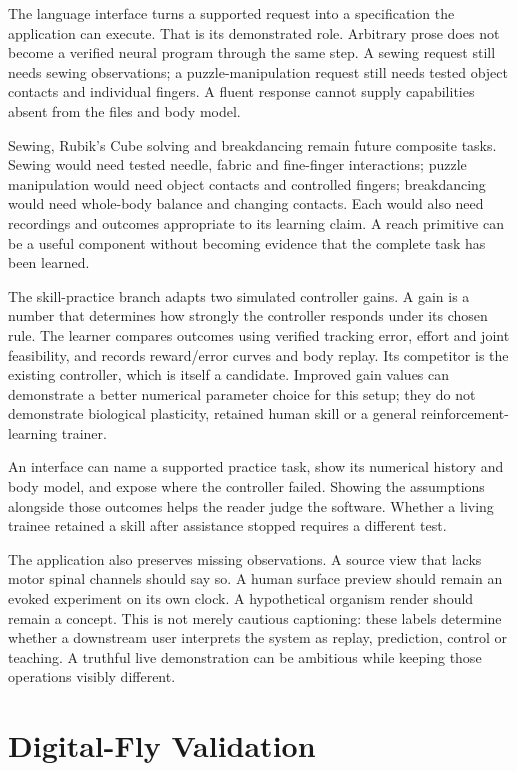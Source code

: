 The language interface turns a supported request into a specification the application can execute. That is its demonstrated role. Arbitrary prose does not become a verified neural program through the same step. A sewing request still needs sewing observations; a puzzle-manipulation request still needs tested object contacts and individual fingers. A fluent response cannot supply capabilities absent from the files and body model.

Sewing, Rubik's Cube solving and breakdancing remain future composite tasks. Sewing would need tested needle, fabric and fine-finger interactions; puzzle manipulation would need object contacts and controlled fingers; breakdancing would need whole-body balance and changing contacts. Each would also need recordings and outcomes appropriate to its learning claim. A reach primitive can be a useful component without becoming evidence that the complete task has been learned.

The skill-practice branch adapts two simulated controller gains. A gain is a number that determines how strongly the controller responds under its chosen rule. The learner compares outcomes using verified tracking error, effort and joint feasibility, and records reward/error curves and body replay. Its competitor is the existing controller, which is itself a candidate. Improved gain values can demonstrate a better numerical parameter choice for this setup; they do not demonstrate biological plasticity, retained human skill or a general reinforcement-learning trainer.

An interface can name a supported practice task, show its numerical history and body model, and expose where the controller failed. Showing the assumptions alongside those outcomes helps the reader judge the software. Whether a living trainee retained a skill after assistance stopped requires a different test.

The application also preserves missing observations. A source view that lacks motor spinal channels should say so. A human surface preview should remain an evoked experiment on its own clock. A hypothetical organism render should remain a concept. This is not merely cautious captioning: these labels determine whether a downstream user interprets the system as replay, prediction, control or teaching. A truthful live demonstration can be ambitious while keeping those operations visibly different.

\section{Digital-Fly Validation}

